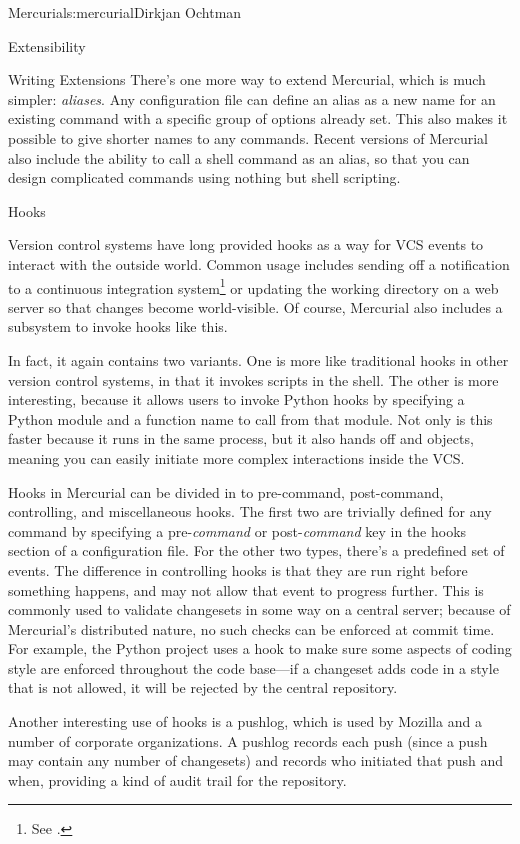 \begin{aosachapter}{Mercurial}{s:mercurial}{Dirkjan Ochtman}
\begin{aosasect1}{Extensibility}
\begin{aosasect2}{Writing Extensions}
There's one more way to extend Mercurial, which is much simpler:
\emph{aliases}. Any configuration file can define an alias as a new
name for an existing command with a specific group of options already
set. This also makes it possible to give shorter names to any
commands. Recent versions of Mercurial also include the ability to
call a shell command as an alias, so that you can design complicated
commands using nothing but shell scripting.

\end{aosasect2}

\begin{aosasect2}{Hooks}

Version control systems have long provided hooks as a way for VCS
events to interact with the outside world. Common usage includes
sending off a notification to a continuous integration
system\footnote{See .} or updating the
working directory on a web server so that changes become
world-visible. Of course, Mercurial also includes a subsystem to
invoke hooks like this.

In fact, it again contains two variants. One is more like traditional
hooks in other version control systems, in that it invokes scripts in
the shell. The other is more interesting, because it allows users to
invoke Python hooks by specifying a Python module and a function name
to call from that module. Not only is this faster because it runs in
the same process, but it also hands off  and  objects, meaning
you can easily initiate more complex interactions inside the VCS.

Hooks in Mercurial can be divided in to pre-command, post-command,
controlling, and miscellaneous hooks. The first two are trivially
defined for any command by specifying a pre-\emph{command} or
post-\emph{command} key in the hooks section of a configuration
file. For the other two types, there's a predefined set of events. The
difference in controlling hooks is that they are run right before
something happens, and may not allow that event to progress further.
This is commonly used to validate changesets in some way on a central
server; because of Mercurial's distributed nature, no such checks can
be enforced at commit time. For example, the Python project uses a
hook to make sure some aspects of coding style are enforced throughout
the code base---if a changeset adds code in a style that is not
allowed, it will be rejected by the central repository.

Another interesting use of hooks is a pushlog, which is used by
Mozilla and a number of corporate organizations. A pushlog
records each push (since a push may contain any number of
changesets) and records who initiated that push and when, providing
a kind of audit trail for the repository.


\end{aosasect2}
\end{aosasect1}
\end{aosachapter}
